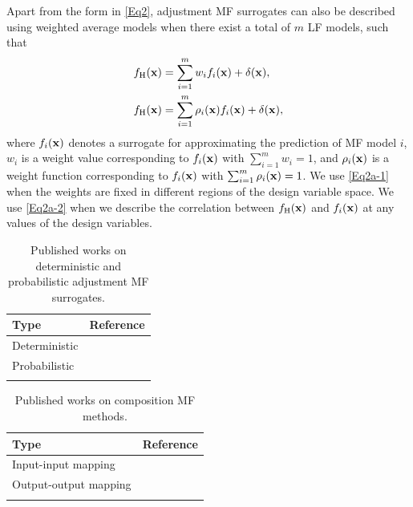 \documentclass[iicol,sn-basic]{sn-jnl}%
\begin{document}
Apart from the form in \cref{Eq2}, adjustment MF surrogates can also be described using weighted average models when there exist a total of $m$ LF models, such that~\citep{Goel2007}
\begin{subequations}\label{Eq2a}
	\begin{align}
		f_\text{H}({\bf x}) & = \sum_{i=1}^{m} w_i f_i({\bf x}) + \delta({\bf x}) \label{Eq2a-1},\\
		f_\text{H}({\bf x}) & = \sum_{i=1}^{m}\rho_i({\bf x})f_i({\bf x}) + \delta({\bf x}) \label{Eq2a-2},
	\end{align}
\end{subequations}
where $f_i({\bf x})$ denotes a surrogate for approximating the prediction of MF model $i$, $w_i$ is a weight value corresponding to $f_i({\bf x})$ with $\sum_{i=1}^{m} w_i = 1$, and $\rho_i({\bf x})$ is a weight function corresponding to $f_i({\bf x})$ with $\sum_{i=1}^{m}\rho_i({\bf x})=1$.
We use \cref{Eq2a-1} when the weights are fixed in different regions of the design variable space.
We use \cref{Eq2a-2} when we describe the correlation between $f_\text{H}({\bf x})$ and $f_i({\bf x})$ at any values of the design variables.

\begin{table}
	\caption{Published works on deterministic and probabilistic adjustment MF surrogates.}
	\label{Table2}
	\centering
	\begin{tabularx}{\textwidth}{lX}
		\hline \noalign{\smallskip}
		Type & Reference\\
		\hline \noalign{\smallskip}
		Deterministic & \cite{ZhangYiming2018,FernandezGodino2019,Song2019,Kou2019,Durantin2017,Han2013,Tyan2015,Nguyen2015,Palar2016,LiuB2016,LYan2019,Rumpfkeil2017,Rumpfkeil2019,Wang2021}  \\
		\noalign{\smallskip}
		Probabilistic &    \cite{Kennedy2000,Forrester2007,Xiong2008,Kuya2011,Toal2011,Han2012,Keane2012,Goh2013,Park2017,Serani2019,Qian2008,Gratiet2013,Gratiet2014,Allaire2014,Parussini2017,Zhou2017kbs,Xiao2018,Ji2023}\\
		\hline \noalign{\smallskip}
	\end{tabularx}
\end{table}

\begin{table}
	\caption{Published works on composition MF methods.}
	\label{Table3}
	\centering
	\begin{tabularx}{\textwidth}{lX}
		\hline \noalign{\smallskip}
		Type & Reference\\
		\hline \noalign{\smallskip}
		Input-input mapping & \cite{Bandler1994,Bandler2004,Koziel2006,Robinson2008,TaoSiyu2019} \\
		\noalign{\smallskip}
		Output-output mapping &  \cite{Zheng2014,Zhou2017aei,Perdikaris2017,Jiang2018,Cutajar2019,Hebbal2021smo,Li2023}   \\
		\hline \noalign{\smallskip}
	\end{tabularx}
\end{table}
\end{document}
